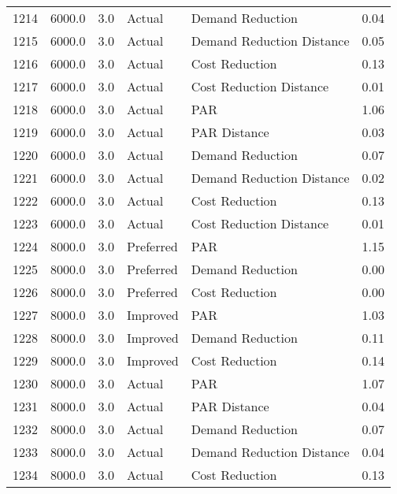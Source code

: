 \begin{longtable}{lrrllr}
1214 &       6000.0 &     3.0 &         Actual &           Demand Reduction &   0.04 \\
1215 &       6000.0 &     3.0 &         Actual &  Demand Reduction Distance &   0.05 \\
1216 &       6000.0 &     3.0 &         Actual &             Cost Reduction &   0.13 \\
1217 &       6000.0 &     3.0 &         Actual &    Cost Reduction Distance &   0.01 \\
1218 &       6000.0 &     3.0 &         Actual &                        PAR &   1.06 \\
1219 &       6000.0 &     3.0 &         Actual &               PAR Distance &   0.03 \\
1220 &       6000.0 &     3.0 &         Actual &           Demand Reduction &   0.07 \\
1221 &       6000.0 &     3.0 &         Actual &  Demand Reduction Distance &   0.02 \\
1222 &       6000.0 &     3.0 &         Actual &             Cost Reduction &   0.13 \\
1223 &       6000.0 &     3.0 &         Actual &    Cost Reduction Distance &   0.01 \\
1224 &       8000.0 &     3.0 &      Preferred &                        PAR &   1.15 \\
1225 &       8000.0 &     3.0 &      Preferred &           Demand Reduction &   0.00 \\
1226 &       8000.0 &     3.0 &      Preferred &             Cost Reduction &   0.00 \\
1227 &       8000.0 &     3.0 &       Improved &                        PAR &   1.03 \\
1228 &       8000.0 &     3.0 &       Improved &           Demand Reduction &   0.11 \\
1229 &       8000.0 &     3.0 &       Improved &             Cost Reduction &   0.14 \\
1230 &       8000.0 &     3.0 &         Actual &                        PAR &   1.07 \\
1231 &       8000.0 &     3.0 &         Actual &               PAR Distance &   0.04 \\
1232 &       8000.0 &     3.0 &         Actual &           Demand Reduction &   0.07 \\
1233 &       8000.0 &     3.0 &         Actual &  Demand Reduction Distance &   0.04 \\
1234 &       8000.0 &     3.0 &         Actual &             Cost Reduction &   0.13 \\

\end{longtable}

